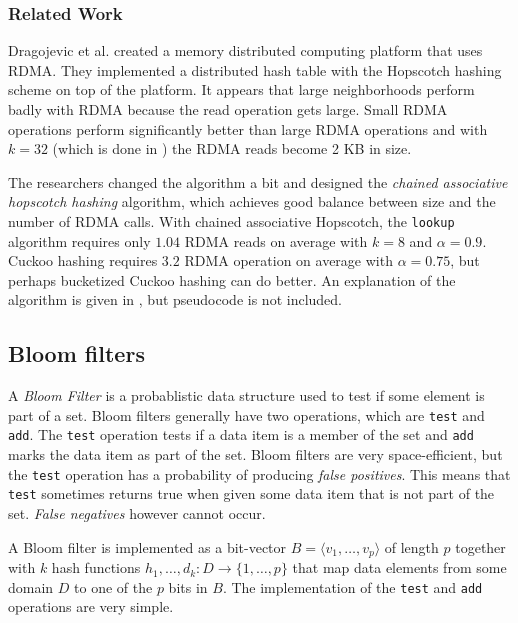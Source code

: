 \subsubsection{Related Work}
Dragojevic et al. \cite{farm} created a memory distributed computing platform that uses RDMA. They implemented a distributed hash table with the Hopscotch hashing scheme on top of the platform. It appears that large neighborhoods perform badly with RDMA because the read operation gets large. Small RDMA operations perform significantly better than large RDMA operations and with $k = 32$ (which is done in \cite{hopscotch}) the RDMA reads become 2 KB in size. 

The researchers changed the algorithm a bit and designed the \emph{chained associative hopscotch hashing} algorithm, which achieves good balance between size and the number of RDMA calls. With chained associative Hopscotch, the \texttt{lookup} algorithm requires only $1.04$ RDMA reads on average with $k = 8$ and $\alpha = 0.9$. Cuckoo hashing requires $3.2$ RDMA operation on average with $\alpha = 0.75$, but perhaps bucketized Cuckoo hashing can do better. An explanation of the algorithm is given in \cite{farm}, but pseudocode is not included.

\subsection{Bloom filters}
A \emph{Bloom Filter} \cite{dharmapurikar2003longest} is a probablistic data structure used to test if some element is part of a set. Bloom filters generally have two operations, which are \texttt{test} and \texttt{add}. The \texttt{test} operation tests if a data item is a member of the set and \texttt{add} marks the data item as part of the set. Bloom filters are very space-efficient, but the \texttt{test} operation has a probability of producing \emph{false positives}. This means that \texttt{test} sometimes returns true when given some data item that is not part of the set. \emph{False negatives} however cannot occur. 

A Bloom filter is implemented as a bit-vector $B = \langle v_1, \dots, v_p \rangle$ of length $p$ together with $k$ hash functions $h_1, \dots, d_k : D \rightarrow \{ 1, \dots, p \}$ that map data elements from some domain $D$ to one of the $p$ bits in $B$. The implementation of the \texttt{test} and \texttt{add} operations are very simple.

